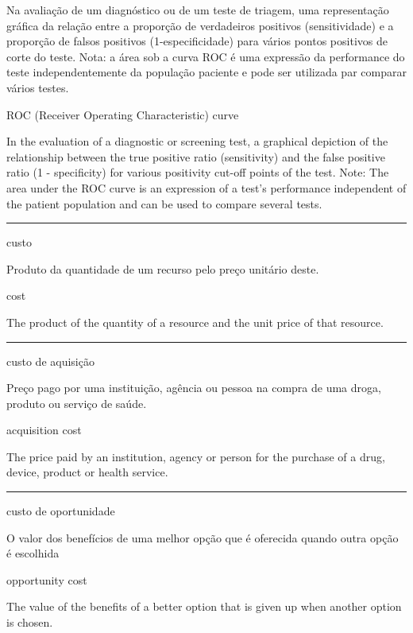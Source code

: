 \documentclass[
]{book}
\begin{document}
Na avaliação de um diagnóstico ou de um teste de triagem, uma representação gráfica da relação entre a proporção de verdadeiros positivos (sensitividade) e a proporção de falsos positivos (1-especificidade) para vários pontos positivos de corte do teste. Nota: a área sob a curva ROC é uma expressão da performance do teste independentemente da população paciente e pode ser utilizada par comparar vários testes.

ROC (Receiver Operating Characteristic) curve

In the evaluation of a diagnostic or screening test, a graphical depiction of the relationship between the true positive ratio (sensitivity) and the false positive ratio (1 - specificity) for various positivity cut-off points of the test. Note: The area under the ROC curve is an expression of a test's performance independent of the patient population and can be used to compare several tests.

\begin{center}\rule{0.5\linewidth}{0.5pt}\end{center}

custo

Produto da quantidade de um recurso pelo preço unitário deste.

cost

The product of the quantity of a resource and the unit price of that resource.

\begin{center}\rule{0.5\linewidth}{0.5pt}\end{center}

custo de aquisição

Preço pago por uma instituição, agência ou pessoa na compra de uma droga, produto ou serviço de saúde.

acquisition cost

The price paid by an institution, agency or person for the purchase of a drug, device, product or health service.

\begin{center}\rule{0.5\linewidth}{0.5pt}\end{center}

custo de oportunidade

O valor dos benefícios de uma melhor opção que é oferecida quando outra opção é escolhida

opportunity cost

The value of the benefits of a better option that is given up when another option is chosen.
\end{document}
